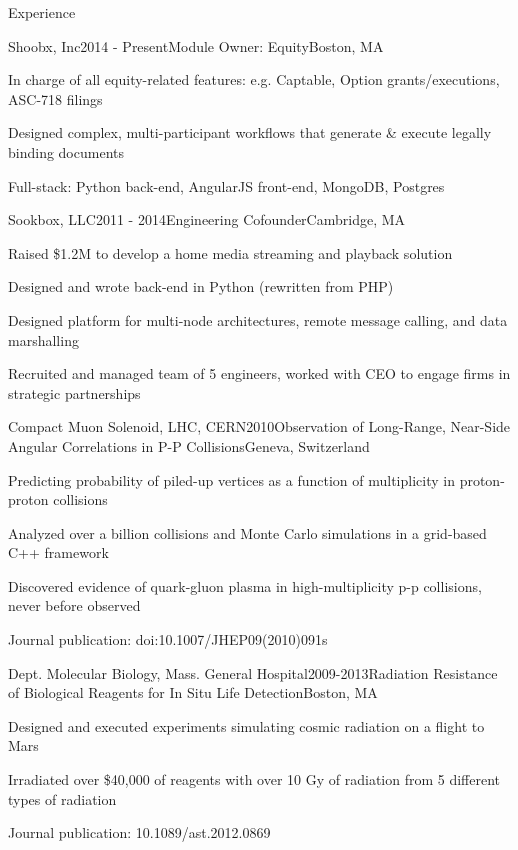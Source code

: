 \documentclass{resume}
\begin{document}

\begin{rSection}{Experience}

\begin{rSubsection}{Shoobx, Inc}{2014 - Present}{Module Owner: Equity}{Boston, MA}
\item In charge of all equity-related features: e.g. Captable, Option grants/executions, ASC-718 filings
\item Designed complex, multi-participant workflows that generate \& execute legally binding documents
\item Full-stack: Python back-end, AngularJS front-end, MongoDB, Postgres
\end{rSubsection}

\begin{rSubsection}{Sookbox, LLC}{2011 - 2014}{Engineering Cofounder}{Cambridge, MA}
\item Raised \$1.2M to develop a home media streaming and playback solution
\item Designed and wrote back-end in Python (rewritten from PHP)
\item Designed platform for multi-node architectures, remote message calling, and data marshalling
\item Recruited and managed team of 5 engineers, worked with CEO to engage firms in strategic partnerships
\end{rSubsection}

\begin{rSubsection}{Compact Muon Solenoid, LHC, CERN}{2010}{Observation of Long-Range, Near-Side Angular Correlations in P-P Collisions}{Geneva, Switzerland}
\item Predicting probability of piled-up vertices as a function of multiplicity in proton-proton collisions
\item Analyzed over a billion collisions and Monte Carlo simulations in a grid-based C++ framework
\item Discovered evidence of quark-gluon plasma in high-multiplicity p-p collisions, never before observed
\item Journal publication: doi:10.1007/JHEP09(2010)091s
\end{rSubsection}

\begin{rSubsection}{Dept. Molecular Biology, Mass. General Hospital}{2009-2013}{Radiation Resistance of Biological Reagents for In Situ Life Detection}{Boston, MA}
\item Designed and executed experiments simulating cosmic radiation on a flight to Mars
\item Irradiated over \$40,000 of reagents with over 10 Gy of radiation from 5 different types of radiation
\item Journal publication: 10.1089/ast.2012.0869
\end{rSubsection}

\end{rSection}
\end{document}
